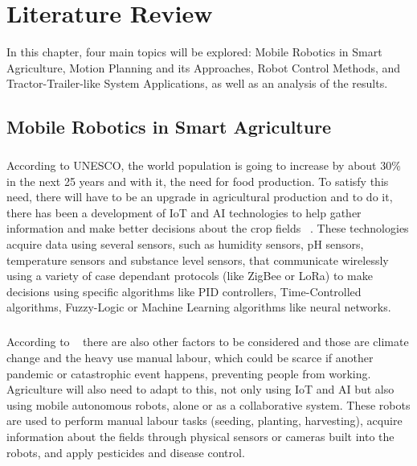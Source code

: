 
%



\chapter{Literature Review}
\label{cha:LR}

\glsresetall

In this chapter, four main topics will be explored: Mobile Robotics in Smart Agriculture, 
Motion Planning and its Approaches, Robot Control Methods, and Tractor-Trailer-like System Applications, 
as well as an analysis of the results.

\section{Mobile Robotics in Smart Agriculture}
\label{sec:MRSM}
\paragraph{}According to UNESCO, the world population is going to increase by about 30\%
in the next 25 years and with it, the need for food production. To satisfy this need, there will 
have to be an upgrade in agricultural production and to do it, there has been a development of IoT and AI
technologies to help gather information and make better decisions about the crop fields ~\cite{9716089}. 
These technologies acquire data using several sensors, such as humidity sensors, pH sensors, 
temperature sensors and substance level sensors, that communicate wirelessly using a variety 
of case dependant protocols (like ZigBee or LoRa) to make decisions using specific algorithms 
like PID controllers, Time-Controlled algorithms, Fuzzy-Logic or Machine Learning algorithms like neural networks.

\paragraph{}According to ~\cite{robotics10020052, article34} there are also other factors to be considered and those are climate change and the heavy use 
manual labour, which could be scarce if another pandemic or catastrophic event happens, preventing people from working. Agriculture will also 
need to adapt to this, not only using IoT and AI but also using mobile autonomous robots, alone or as a collaborative system. 
These robots are used to perform manual labour tasks (seeding, planting, harvesting), acquire information 
about the fields through physical sensors or cameras built into the robots, and apply pesticides and disease control.

